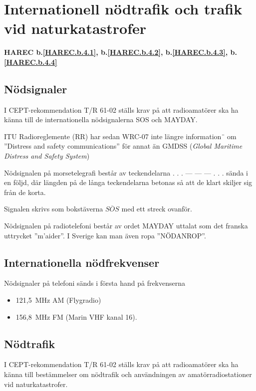 \section{Internationell nödtrafik och trafik vid naturkatastrofer}
\textbf{
	HAREC b.\ref{HAREC.b.4.1}\label{myHAREC.b.4.1},
	b.\ref{HAREC.b.4.2}\label{myHAREC.b.4.2},
	b.\ref{HAREC.b.4.3}\label{myHAREC.b.4.3},
	b.\ref{HAREC.b.4.4}\label{myHAREC.b.4.4}
}

\subsection{Nödsignaler}

I CEPT-rekommendation T/R 61-02 \cite{TR6102} ställs krav på att radioamatörer
ska ha känna till de internationella nödsignalerna SOS och MAYDAY.

ITU Radioreglemente (RR) \cite{ITU-RR} har sedan WRC-07 inte längre information¨
om ''Distress and safety communications'' för annat än
GMDSS (\emph{Global Maritime Distress and Safety System})

Nödsignalen på morsetelegrafi består av teckendelarna . . . --- --- --- . . .
sända i en följd, där längden på de långa teckendelarna betonas så att de klart
skiljer sig från de korta.

Signalen skrivs som bokstäverna $\overline{SOS}$ med ett streck ovanför.

Nödsignalen på radiotelefoni består av ordet MAYDAY uttalat som det franska
uttrycket ''m'aider''. I Sverige kan man även ropa ''NÖDANROP''.

\subsection{Internationella nödfrekvenser}

Nödsignaler på telefoni sänds i första hand på frekvenserna
\begin{itemize}
	\item 121,5~MHz AM (Flygradio)
	\item 156,8~MHz FM (Marin VHF kanal 16).
\end{itemize}

\subsection{Nödtrafik}

I CEPT-rekommendation T/R 61-02 \cite{TR6102} ställs krav på att radioamatörer
ska ha känna till bestämmelser om nödtrafik och användningen av
amatörradiostationer vid naturkatastrofer.

